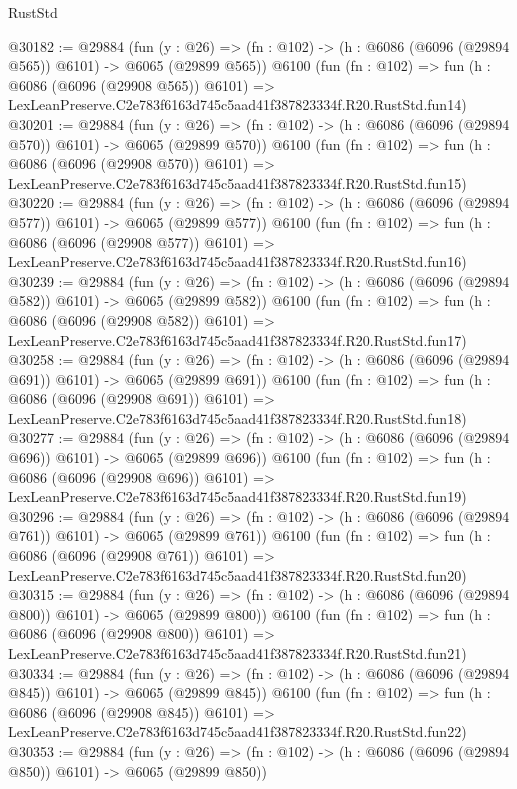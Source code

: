 \begin{lexlean}{RustStd}
\begin{coremodule}
@30182 := @29884
    (fun (y : @26) => (fn : @102) -> (h : @6086 (@6096 (@29894 @565)) @6101) -> @6065 (@29899 @565))
    @6100
    (fun (fn : @102) =>
    fun (h : @6086 (@6096 (@29908 @565)) @6101) =>
    LexLeanPreserve.C2e783f6163d745c5aad41f387823334f.R20.RustStd.fun14)
@30201 := @29884
    (fun (y : @26) => (fn : @102) -> (h : @6086 (@6096 (@29894 @570)) @6101) -> @6065 (@29899 @570))
    @6100
    (fun (fn : @102) =>
    fun (h : @6086 (@6096 (@29908 @570)) @6101) =>
    LexLeanPreserve.C2e783f6163d745c5aad41f387823334f.R20.RustStd.fun15)
@30220 := @29884
    (fun (y : @26) => (fn : @102) -> (h : @6086 (@6096 (@29894 @577)) @6101) -> @6065 (@29899 @577))
    @6100
    (fun (fn : @102) =>
    fun (h : @6086 (@6096 (@29908 @577)) @6101) =>
    LexLeanPreserve.C2e783f6163d745c5aad41f387823334f.R20.RustStd.fun16)
@30239 := @29884
    (fun (y : @26) => (fn : @102) -> (h : @6086 (@6096 (@29894 @582)) @6101) -> @6065 (@29899 @582))
    @6100
    (fun (fn : @102) =>
    fun (h : @6086 (@6096 (@29908 @582)) @6101) =>
    LexLeanPreserve.C2e783f6163d745c5aad41f387823334f.R20.RustStd.fun17)
@30258 := @29884
    (fun (y : @26) => (fn : @102) -> (h : @6086 (@6096 (@29894 @691)) @6101) -> @6065 (@29899 @691))
    @6100
    (fun (fn : @102) =>
    fun (h : @6086 (@6096 (@29908 @691)) @6101) =>
    LexLeanPreserve.C2e783f6163d745c5aad41f387823334f.R20.RustStd.fun18)
@30277 := @29884
    (fun (y : @26) => (fn : @102) -> (h : @6086 (@6096 (@29894 @696)) @6101) -> @6065 (@29899 @696))
    @6100
    (fun (fn : @102) =>
    fun (h : @6086 (@6096 (@29908 @696)) @6101) =>
    LexLeanPreserve.C2e783f6163d745c5aad41f387823334f.R20.RustStd.fun19)
@30296 := @29884
    (fun (y : @26) => (fn : @102) -> (h : @6086 (@6096 (@29894 @761)) @6101) -> @6065 (@29899 @761))
    @6100
    (fun (fn : @102) =>
    fun (h : @6086 (@6096 (@29908 @761)) @6101) =>
    LexLeanPreserve.C2e783f6163d745c5aad41f387823334f.R20.RustStd.fun20)
@30315 := @29884
    (fun (y : @26) => (fn : @102) -> (h : @6086 (@6096 (@29894 @800)) @6101) -> @6065 (@29899 @800))
    @6100
    (fun (fn : @102) =>
    fun (h : @6086 (@6096 (@29908 @800)) @6101) =>
    LexLeanPreserve.C2e783f6163d745c5aad41f387823334f.R20.RustStd.fun21)
@30334 := @29884
    (fun (y : @26) => (fn : @102) -> (h : @6086 (@6096 (@29894 @845)) @6101) -> @6065 (@29899 @845))
    @6100
    (fun (fn : @102) =>
    fun (h : @6086 (@6096 (@29908 @845)) @6101) =>
    LexLeanPreserve.C2e783f6163d745c5aad41f387823334f.R20.RustStd.fun22)
@30353 := @29884
    (fun (y : @26) => (fn : @102) -> (h : @6086 (@6096 (@29894 @850)) @6101) -> @6065 (@29899 @850))

\end{coremodule}
\end{lexlean}
